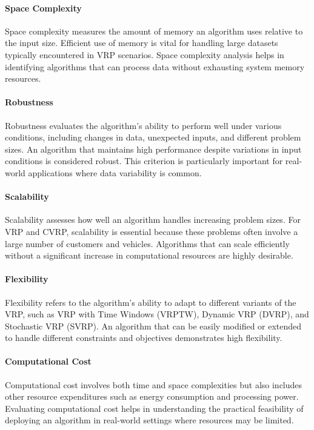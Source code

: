 \documentclass[
]{article}
\begin{document}
  \paragraph{Space Complexity} Space complexity measures the amount of memory an algorithm uses relative to the input size. Efficient use of memory is vital for handling large datasets typically encountered in VRP scenarios. Space complexity analysis helps in identifying algorithms that can process data without exhausting system memory resources.
  
  \paragraph{Robustness} Robustness evaluates the algorithm’s ability to perform well under various conditions, including changes in data, unexpected inputs, and different problem sizes. An algorithm that maintains high performance despite variations in input conditions is considered robust. This criterion is particularly important for real-world applications where data variability is common.
  
  \paragraph{Scalability} Scalability assesses how well an algorithm handles increasing problem sizes. For VRP and CVRP, scalability is essential because these problems often involve a large number of customers and vehicles. Algorithms that can scale efficiently without a significant increase in computational resources are highly desirable.
  
  \paragraph{Flexibility} Flexibility refers to the algorithm’s ability to adapt to different variants of the VRP, such as VRP with Time Windows (VRPTW), Dynamic VRP (DVRP), and Stochastic VRP (SVRP). An algorithm that can be easily modified or extended to handle different constraints and objectives demonstrates high flexibility.
  
  \paragraph{Computational Cost} Computational cost involves both time and space complexities but also includes other resource expenditures such as energy consumption and processing power. Evaluating computational cost helps in understanding the practical feasibility of deploying an algorithm in real-world settings where resources may be limited.
  
\end{document}
